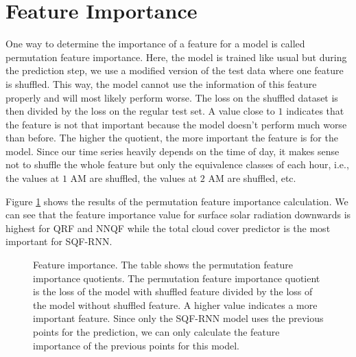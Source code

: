 \section{Feature Importance}
\label{sec:feature-importance}



One way to determine the importance of a feature for a model is called 
permutation feature importance. Here, the model is trained like usual but during the prediction step, 
we use a modified version of the test data where one feature is shuffled. 
This way, the model cannot use the information of this feature properly 
and will most likely perform worse. The loss on the shuffled dataset is 
then divided by the loss on the regular test set. A value close to \(1\) 
indicates that the feature is not that important because the model doesn't perform 
much worse than before. The higher the quotient, the more important the feature is for the model.
Since our time series heavily depends on the time of day, it makes sense 
not to shuffle the whole feature but only the equivalence classes of each hour, 
i.e., the values at \(1\) AM are shuffled, the values at \(2\) AM are shuffled, etc.

Figure \ref{fig:feature-importance} 
shows the results of the permutation feature importance calculation. 
We can see that the feature importance value for surface solar radiation downwards 
is highest for QRF and NNQF while the total cloud cover predictor is the most important 
for SQF-RNN.

\begin{figure}[h!]
    
    \caption[Feature importance]{Feature importance. 
    The table shows the permutation feature importance quotients. 
    The permutation feature importance quotient is 
    the loss of the model with shuffled feature 
    divided by the loss of the model without shuffled feature. 
    A higher value indicates a more important feature.
    Since only the SQF-RNN model uses the previous points for the prediction, 
    we can only calculate the feature importance of the previous points for this model.}
    \label{fig:feature-importance}
\end{figure}